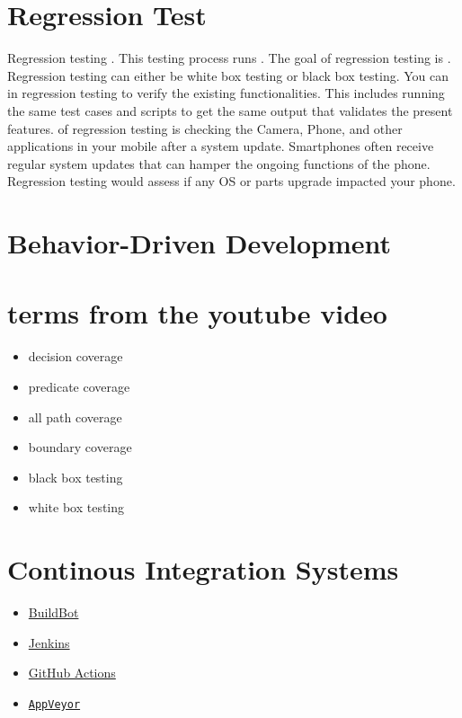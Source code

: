 \section{Regression Test}
Regression testing . 
This testing process runs 
\newline
{}.
\newline
The goal of regression testing is 
\newline
{}. 
Regression testing can either be white box testing or black box testing.
\newline
You can  in regression testing to verify the existing 
functionalities. This includes running the same test cases and scripts 
to get the same output that validates the present features.
\newline
{} of regression testing is checking the Camera, Phone, and other 
applications in your mobile after a system update. Smartphones often receive 
regular system updates that can hamper the ongoing functions of the phone. 
Regression testing would assess if any OS or parts upgrade impacted your phone.

\section{Behavior-Driven Development}

\section{terms from the youtube video}
\begin{itemize}
    \item decision coverage
    \item predicate coverage
    \item all path coverage
    \item boundary coverage
    \item black box testing
    \item white box testing
\end{itemize}

\section{Continous Integration Systems}
\begin{itemize}
    \item \href{https://buildbot.net/}{BuildBot}
    \item \href{https://www.jenkins.io/}{Jenkins}
    \item \href{https://github.com/features/actions}{GitHub Actions}
    \item \href{https://www.appveyor.com/}{\texttt{AppVeyor}}
\end{itemize}
